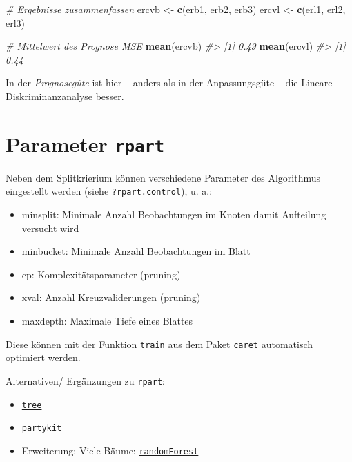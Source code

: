 \documentclass[12pt,]{book}
\newenvironment{Shaded}{\begin{snugshade}}{\end{snugshade}}
\newcommand{\KeywordTok}[1]{\textcolor[rgb]{0.13,0.29,0.53}{\textbf{{#1}}}}
\newcommand{\StringTok}[1]{\textcolor[rgb]{0.31,0.60,0.02}{{#1}}}
\newcommand{\CommentTok}[1]{\textcolor[rgb]{0.56,0.35,0.01}{\textit{{#1}}}}
\newcommand{\NormalTok}[1]{{#1}}
\providecommand{\tightlist}{%
  \setlength{\itemsep}{0pt}\setlength{\parskip}{0pt}}
\begin{document}
\begin{Shaded}
\begin{Highlighting}[]
\CommentTok{# Ergebnisse zusammenfassen}
\NormalTok{ercvb <-}\StringTok{ }\KeywordTok{c}\NormalTok{(erb1, erb2, erb3)}
\NormalTok{ercvl <-}\StringTok{ }\KeywordTok{c}\NormalTok{(erl1, erl2, erl3)}

\CommentTok{# Mittelwert des Prognose MSE}
\KeywordTok{mean}\NormalTok{(ercvb)}
\CommentTok{#> [1] 0.49}
\KeywordTok{mean}\NormalTok{(ercvl)}
\CommentTok{#> [1] 0.44}
\end{Highlighting}
\end{Shaded}

In der \emph{Prognosegüte} ist hier -- anders als in der Anpassungsgüte
-- die Lineare Diskriminanzanalyse besser.

\section{\texorpdfstring{Parameter
\texttt{rpart}}{Parameter rpart}}\label{parameter-rpart}

Neben dem Splitkrierium können verschiedene Parameter des Algorithmus
eingestellt werden (siehe \texttt{?rpart.control}), u. a.:

\begin{itemize}
\tightlist
\item
  minsplit: Minimale Anzahl Beobachtungen im Knoten damit Aufteilung
  versucht wird
\item
  minbucket: Minimale Anzahl Beobachtungen im Blatt
\item
  cp: Komplexitätsparameter (pruning)
\item
  xval: Anzahl Kreuzvaliderungen (pruning)
\item
  maxdepth: Maximale Tiefe eines Blattes
\end{itemize}

Diese können mit der Funktion \texttt{train} aus dem Paket
\href{https://topepo.github.io/caret/index.html}{\texttt{caret}}
automatisch optimiert werden.

Alternativen/ Ergänzungen zu \texttt{rpart}:

\begin{itemize}
\tightlist
\item
  \href{https://cran.r-project.org/web/packages/tree/}{\texttt{tree}}
\item
  \href{http://partykit.r-forge.r-project.org/partykit/}{\texttt{partykit}}
\item
  Erweiterung: Viele Bäume:
  \href{https://cran.r-project.org/web/packages/randomForest/}{\texttt{randomForest}}
\end{itemize}
\end{document}
